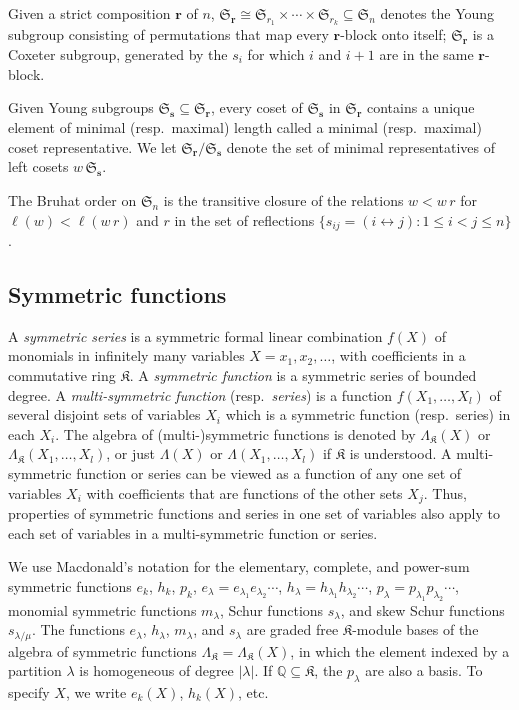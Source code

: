 \documentclass[12pt]{amsart}
\theoremstyle{definition}
\theoremstyle{remark}
\newcommand{\multisymmetric}{(multi\mbox{-})symmetric }
\newcommand{\QQ}{{\mathbb Q}}
\newcommand{\rr}{{\mathbf r}}
\newcommand{\sS}{{\mathbf s}}
\newcommand{\Kfrak}{{\mathfrak K}}
\newcommand{\Sfrak}{{\mathfrak S}}
\begin{document}
Given a strict composition $\rr $ of $n$, $\Sfrak _{\rr } \cong
\Sfrak_{r_{1}}\times \cdots \times \Sfrak _{r_{k}}\subseteq \Sfrak
_{n}$ denotes the Young subgroup consisting of permutations that map
every $\rr $-block onto itself; $\Sfrak _{\rr }$ is a Coxeter
subgroup, generated by the $s_{i}$ for which $i$ and $i+1$ are in the
same $\rr $-block.

Given Young subgroups $\Sfrak _{\sS } \subseteq \Sfrak _{\rr}$, every
coset of $\Sfrak_{\sS}$ in $\Sfrak _{\rr}$ contains a unique element
of minimal (resp.\ maximal) length called a minimal (resp.\ maximal)
coset representative.  We let $\Sfrak _{\rr}/ \Sfrak _{\sS }$ denote
the set of minimal representatives of left cosets $w\, \Sfrak_{\sS}$.

The Bruhat order on $\Sfrak_n$ is the transitive closure of the relations
$w < w \, r$ for  $\ell(w) < \ell(w \, r)$ and  $r$ in the set of reflections
$\{s_{ij} = (i \leftrightarrow j) : 1 \le i < j \le n\}$.


\subsection{Symmetric functions}
\label{ss:symmetric-functions}

A {\em symmetric series} is a symmetric formal linear combination
$f(X)$ of monomials in infinitely many variables $X =
x_{1},x_{2},\ldots $, with coefficients in a commutative ring $\Kfrak
$.  A {\em symmetric function} is a symmetric series of bounded
degree.  A {\em multi-symmetric function} (resp.\ {\em series}) is a
function $f(X_{1},\ldots,X_{l})$ of several disjoint sets of variables
$X_{i}$ which is a symmetric function (resp.\ series) in each $X_{i}$.
The algebra of \multisymmetric functions is denoted by $\Lambda
_{\Kfrak }(X)$ or $\Lambda _{\Kfrak }(X_{1}, \ldots, X_{l})$, or just
$\Lambda (X)$ or $\Lambda (X_{1}, \ldots, X_{l})$ if $\Kfrak $ is
understood.  A multi-symmetric function or series can be viewed as a
function of any one set of variables $X_{i}$ with coefficients that
are functions of the other sets $X_{j}$.  Thus, properties of
symmetric functions and series in one set of variables also apply to
each set of variables in a multi-symmetric function or series.

We use Macdonald's notation \cite{Macdonald95} for the elementary,
complete, and power-sum symmetric functions $e_{k}$, $h_{k}$, $p_{k}$,
$e_{\lambda } = e_{\lambda _{1}} e_{\lambda _{2}}\cdots $, $h_{\lambda
} = h_{\lambda _{1}} h_{\lambda _{2}}\cdots $, $p_{\lambda } =
p_{\lambda _{1}} p_{\lambda _{2}}\cdots $, monomial symmetric
functions $m_{\lambda }$, Schur functions $s_{\lambda }$, and skew
Schur functions $s_{\lambda /\mu }$.  The functions $ e_{\lambda }$,
$h_{\lambda }$, $m_{\lambda } $, and $s_{\lambda }$ are graded free
$\Kfrak $-module bases of the algebra of symmetric functions $\Lambda
_{\Kfrak } = \Lambda _{\Kfrak }(X)$, in which the element indexed by a
partition $\lambda $ is homogeneous of degree $|\lambda |$.  If $\QQ
\subseteq \Kfrak $, the $p_{\lambda }$ are also a basis.  To specify
$X$, we write $e_{k}(X)$, $h_{k}(X)$, etc.
\end{document}
